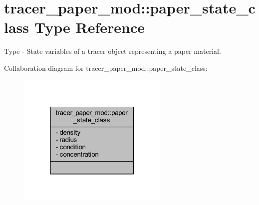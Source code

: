 \hypertarget{structtracer__paper__mod_1_1paper__state__class}{}\section{tracer\+\_\+paper\+\_\+mod\+:\+:paper\+\_\+state\+\_\+class Type Reference}
\label{structtracer__paper__mod_1_1paper__state__class}


Type -\/ State variables of a tracer object representing a paper material.  




Collaboration diagram for tracer\+\_\+paper\+\_\+mod\+:\+:paper\+\_\+state\+\_\+class\+:
\nopagebreak
\begin{figure}[H]
\begin{center}
\leavevmode
\includegraphics[width=205pt]{structtracer__paper__mod_1_1paper__state__class__coll__graph}
\end{center}
\end{figure}
